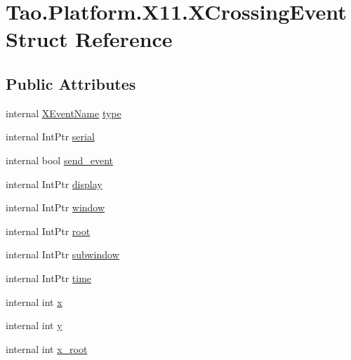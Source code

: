 \hypertarget{struct_tao_1_1_platform_1_1_x11_1_1_x_crossing_event}{
\section{Tao.Platform.X11.XCrossingEvent Struct Reference}
\label{struct_tao_1_1_platform_1_1_x11_1_1_x_crossing_event}
}
\subsection*{Public Attributes}
\begin{DoxyCompactItemize}
\item 
internal \hyperlink{namespace_tao_1_1_platform_1_1_x11_aff81ed5b8778e1ea8e872861dff9f146}{XEventName} \hyperlink{struct_tao_1_1_platform_1_1_x11_1_1_x_crossing_event_afd224785315bdaf7defcf71345cc2a76}{type}
\item 
internal IntPtr \hyperlink{struct_tao_1_1_platform_1_1_x11_1_1_x_crossing_event_a11f73e273d0a604ecd54c36b03405816}{serial}
\item 
internal bool \hyperlink{struct_tao_1_1_platform_1_1_x11_1_1_x_crossing_event_a736b61bae516f5c0c78f74d3edfee400}{send\_\-event}
\item 
internal IntPtr \hyperlink{struct_tao_1_1_platform_1_1_x11_1_1_x_crossing_event_aada99d32f5da118d139f04da259995b5}{display}
\item 
internal IntPtr \hyperlink{struct_tao_1_1_platform_1_1_x11_1_1_x_crossing_event_a8505986d2f9111bbc117b50a219aed20}{window}
\item 
internal IntPtr \hyperlink{struct_tao_1_1_platform_1_1_x11_1_1_x_crossing_event_a0b28dc4f7ef108a486233700612de8d2}{root}
\item 
internal IntPtr \hyperlink{struct_tao_1_1_platform_1_1_x11_1_1_x_crossing_event_af9ab5e6bb464487df2568f9da9a0b6f2}{subwindow}
\item 
internal IntPtr \hyperlink{struct_tao_1_1_platform_1_1_x11_1_1_x_crossing_event_a0be906e99e919e687a2b09f3ee2f2dce}{time}
\item 
internal int \hyperlink{struct_tao_1_1_platform_1_1_x11_1_1_x_crossing_event_a055b50b71bb0dd7e6439639ff3a32bc6}{x}
\item 
internal int \hyperlink{struct_tao_1_1_platform_1_1_x11_1_1_x_crossing_event_aa3d845a0b14afde204e4af7add83e786}{y}
\item 
internal int \hyperlink{struct_tao_1_1_platform_1_1_x11_1_1_x_crossing_event_a7a835261ad1e415ecf2fc049e0ad0bdb}{x\_\-root}

\end{DoxyCompactItemize}
